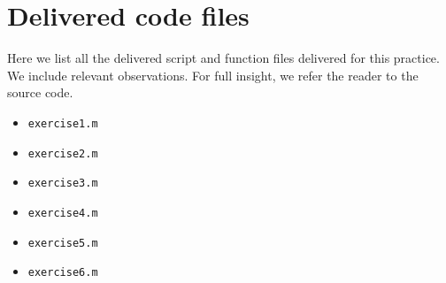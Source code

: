 \section{Delivered code files}

Here we list all the delivered script and function files delivered for this practice.
We include relevant observations. For full insight, we refer the reader to the
source code.

\begin{itemize}
	\item \texttt{exercise1.m}
	\item \texttt{exercise2.m}
	\item \texttt{exercise3.m}
	\item \texttt{exercise4.m}
	\item \texttt{exercise5.m}
	\item \texttt{exercise6.m}
\end{itemize}
